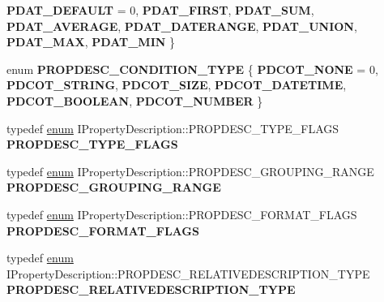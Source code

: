 \begin{DoxyCompactItemize}
{\bfseries P\+D\+A\+T\+\_\+\+D\+E\+F\+A\+U\+LT} = 0, 
{\bfseries P\+D\+A\+T\+\_\+\+F\+I\+R\+ST}, 
{\bfseries P\+D\+A\+T\+\_\+\+S\+UM}, 
{\bfseries P\+D\+A\+T\+\_\+\+A\+V\+E\+R\+A\+GE}, 
\newline
{\bfseries P\+D\+A\+T\+\_\+\+D\+A\+T\+E\+R\+A\+N\+GE}, 
{\bfseries P\+D\+A\+T\+\_\+\+U\+N\+I\+ON}, 
{\bfseries P\+D\+A\+T\+\_\+\+M\+AX}, 
{\bfseries P\+D\+A\+T\+\_\+\+M\+IN}
 \}
\item 
\mbox{\label{interface_i_property_description_a67f7b5ae45c8c4c3b22d1743172e30c7}} 
enum {\bfseries P\+R\+O\+P\+D\+E\+S\+C\+\_\+\+C\+O\+N\+D\+I\+T\+I\+O\+N\+\_\+\+T\+Y\+PE} \{ \newline
{\bfseries P\+D\+C\+O\+T\+\_\+\+N\+O\+NE} = 0, 
{\bfseries P\+D\+C\+O\+T\+\_\+\+S\+T\+R\+I\+NG}, 
{\bfseries P\+D\+C\+O\+T\+\_\+\+S\+I\+ZE}, 
{\bfseries P\+D\+C\+O\+T\+\_\+\+D\+A\+T\+E\+T\+I\+ME}, 
\newline
{\bfseries P\+D\+C\+O\+T\+\_\+\+B\+O\+O\+L\+E\+AN}, 
{\bfseries P\+D\+C\+O\+T\+\_\+\+N\+U\+M\+B\+ER}
 \}
\item 
\mbox{\label{interface_i_property_description_acc8bb33b799ea4e44fe95dfafc6e71b5}} 
typedef \hyperlink{interfaceenum}{enum} I\+Property\+Description\+::\+P\+R\+O\+P\+D\+E\+S\+C\+\_\+\+T\+Y\+P\+E\+\_\+\+F\+L\+A\+GS {\bfseries P\+R\+O\+P\+D\+E\+S\+C\+\_\+\+T\+Y\+P\+E\+\_\+\+F\+L\+A\+GS}
\item 
\mbox{\label{interface_i_property_description_a3d3007d26423b38109bdbd97bfb7fafd}} 
typedef \hyperlink{interfaceenum}{enum} I\+Property\+Description\+::\+P\+R\+O\+P\+D\+E\+S\+C\+\_\+\+G\+R\+O\+U\+P\+I\+N\+G\+\_\+\+R\+A\+N\+GE {\bfseries P\+R\+O\+P\+D\+E\+S\+C\+\_\+\+G\+R\+O\+U\+P\+I\+N\+G\+\_\+\+R\+A\+N\+GE}
\item 
\mbox{\label{interface_i_property_description_ae47c8d2e36fb9f57ac9de81be481a609}} 
typedef \hyperlink{interfaceenum}{enum} I\+Property\+Description\+::\+P\+R\+O\+P\+D\+E\+S\+C\+\_\+\+F\+O\+R\+M\+A\+T\+\_\+\+F\+L\+A\+GS {\bfseries P\+R\+O\+P\+D\+E\+S\+C\+\_\+\+F\+O\+R\+M\+A\+T\+\_\+\+F\+L\+A\+GS}
\item 
\mbox{\label{interface_i_property_description_ad8b4d25ba59d410865c3adeef51b7269}} 
typedef \hyperlink{interfaceenum}{enum} I\+Property\+Description\+::\+P\+R\+O\+P\+D\+E\+S\+C\+\_\+\+R\+E\+L\+A\+T\+I\+V\+E\+D\+E\+S\+C\+R\+I\+P\+T\+I\+O\+N\+\_\+\+T\+Y\+PE {\bfseries P\+R\+O\+P\+D\+E\+S\+C\+\_\+\+R\+E\+L\+A\+T\+I\+V\+E\+D\+E\+S\+C\+R\+I\+P\+T\+I\+O\+N\+\_\+\+T\+Y\+PE}

\end{DoxyCompactItemize}
